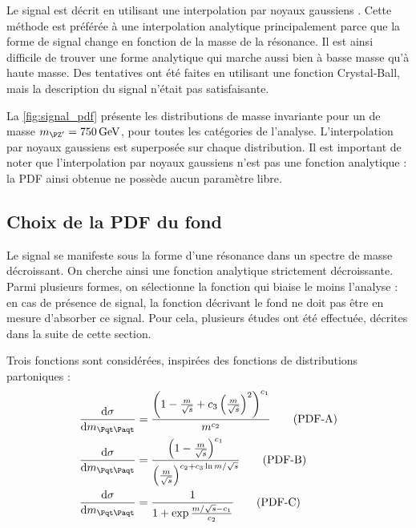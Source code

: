 Le signal est décrit en utilisant une interpolation par noyaux gaussiens \citep{Cranmer:2000du}. Cette méthode est préférée à une interpolation analytique principalement parce que la forme de signal change en fonction de la masse de la résonance. Il est ainsi difficile de trouver une forme analytique qui marche aussi bien à basse masse qu'à haute masse. Des tentatives ont été faites en utilisant une fonction Crystal-Ball, mais la description du signal n'était pas satisfaisante.

\medskip

La \cref{fig:signal_pdf} présente les distributions de masse invariante pour un \zprime de masse $\mzp = \SI{750}{\GeV}$, pour toutes les catégories de l'analyse. L'interpolation par noyaux gaussiens est superposée sur chaque distribution. Il est important de noter que l'interpolation par noyaux gaussiens n'est pas une fonction analytique : la PDF ainsi obtenue ne possède aucun paramètre libre.

\subsection{Choix de la PDF du fond} \label{sec:zp_bkg_pdf}

Le signal se manifeste sous la forme d'une résonance dans un spectre de masse décroissant. On cherche ainsi une fonction analytique strictement décroissante. Parmi plusieurs formes, on sélectionne la fonction qui biaise le moins l'analyse : en cas de présence de signal, la fonction décrivant le fond ne doit pas être en mesure d'absorber ce signal. Pour cela, plusieurs études ont été effectuée, décrites dans la suite de cette section.

\medskip

Trois fonctions sont considérées, inspirées des fonctions de distributions partoniques :
\begin{align}
  \frac{\mathrm{d}\sigma}{\mathrm{d}\mtt} &= \frac{\left( 1 - \frac{m}{\sqrt{s}} + c_3 \left( \frac{m}{\sqrt{s}} \right)^2 \right)^{c_1}}{m^{c_2}} \tag{PDF-A} \label{pdfA} \\
  \frac{\mathrm{d}\sigma}{\mathrm{d}\mtt} &= \frac{\left( 1 - \frac{m}{\sqrt{s}} \right)^{c_1} }{ \left( \frac{m}{\sqrt{s}}  \right)^{c_2 + c_3\ln{m / \sqrt{s}}}} \tag{PDF-B} \label{pdfB} \\
  \frac{\mathrm{d}\sigma}{\mathrm{d}\mtt} &= \frac{1}{1 + \exp{\frac{m / \sqrt{s} - c_1}{c_2}}} \tag{PDF-C} \label{pdfC}
\end{align}

